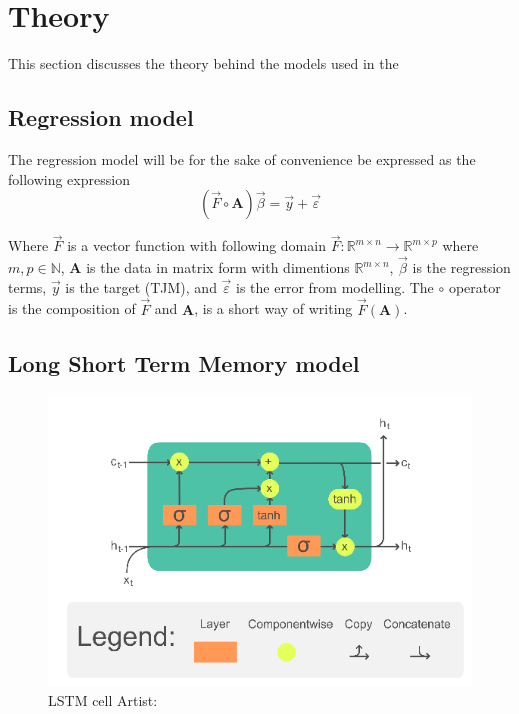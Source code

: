 \section{Theory}\label{sec:theory}

This section discusses the theory behind the models used in the 

\subsection{Regression model}

The regression model will be for the sake of convenience be expressed as the following expression
$$
\left(\vec{F}\circ \mathbf{A}\right)\vec{\beta}=\vec{y}+\vec{\varepsilon}
$$

Where $\vec{F}$ is a vector function with following domain $\vec{F}:\mathbb{R}^{m\times n}\to \mathbb{R}^{m\times p}$ where $m,p\in \mathbb{N}$, $\mathbf{A}$ is the data in matrix form with dimentions $\mathbb{R}^{m\times n}$, $\vec{\beta}$ is the regression terms, $\vec{y}$ is the target (TJM), and $\vec{\varepsilon}$ is the error from modelling. The $\circ$ operator is the composition of $\vec{F}$ and $\mathbf{A}$, is a short way of writing $\vec{F}(\mathbf{A})$.

\subsection{Long Short Term Memory model}

\begin{figure}
	\centering
	\includegraphics[width=0.7\linewidth]{figures/LSTM_Cell}
	\caption{LSTM cell  Artist: \cite{chevalier_english_2018}}
	\label{fig:lstmcell}
\end{figure}

